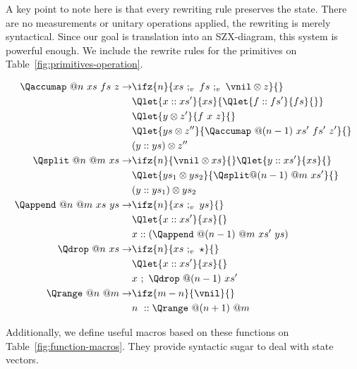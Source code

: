 A key point to note here is that every rewriting rule preserves the state. There are no measurements or unitary operations applied, the rewriting is merely syntactical. Since our goal is translation into an SZX-diagram, this system is powerful enough. We include the rewrite rules for the primitives on Table~\ref{fig:primitives-operation}.

\begin{table}[htbp]
  \begin{align*}
  \Qaccumap\ @n\ xs\ fs\ z \to
    & \ifz{n}{xs\ ;_v\ fs\ ;_v\ \vnil\otimes z}{}\\
    & \Qlet{x :: xs'}{xs}{\Qlet{f :: fs'}{fs}{}}\\
    & \Qlet{y\otimes z'}{f\ x\ z}{}\\
    & \Qlet{ys \otimes z''}{\Qaccumap\ @(n-1)\ xs'\ fs'\ z'}{}\\
    & (y :: ys) \otimes z''\\
  \Qsplit\ @n\ @m\ xs \to
    & \ifz{n}{\vnil\otimes xs}{} \Qlet{y :: xs'}{xs}{}\\
    & \Qlet{ys_1\otimes ys_2}{\Qsplit @(n-1)\ @m\ xs'}{}\\
    & (y :: ys_1)\otimes ys_2\\
  \Qappend\ @n\ @m\ xs\ ys \to
    & \ifz{n}{xs\ ;_v\ ys}{} \\
    & \Qlet{x :: xs'}{xs}{}\\
    & x :: (\Qappend\ @(n-1)\ @m\ xs'\ ys) \\
  \Qdrop\ @n\ xs \to
    & \ifz{n}{xs\ ;_v\ \star}{}\\
    & \Qlet{x :: xs'}{xs}{}\\
    & x\ ;\ \Qdrop\ @(n-1)\ xs'\\
  \Qrange\ @n\ @m \to
    & \ifz{m-n}{\vnil}{}\\
    & n\ :: \Qrange\ @(n+1)\ @m
  \end{align*}
  \caption{Reductions pertaining to the primitives.}
  \label{fig:primitives-operation}
\end{table}

Additionally, we define useful macros based on these functions on Table~\ref{fig:function-macros}. They provide syntactic sugar to deal with state vectors.

